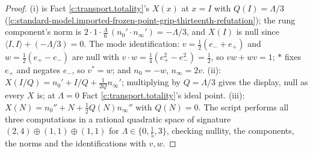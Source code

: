 \documentclass[11pt]{article}
\theoremstyle{definition}
\theoremstyle{plain}
\providecommand{\nInf}{}\renewcommand{\nInf}{n_\infty}
\providecommand{\nO}{}\renewcommand{\nO}{n_0}
\providecommand{\ip}{}\renewcommand{\ip}[2]{\langle #1, #2\rangle}
\begin{document}
\begin{proof}
(i) is Fact \ref{c:transport.totality}'s $X(x)$ at $x = I$ with $Q(I) = \Lambda/3$ (\ref{c:standard-model.imported-frozen-point-grip-thirteenth-refutation}); the rung component's norm is $2 \cdot 1 \cdot \tfrac{\Lambda}{6}\,(\nO' \cdot \nInf') = -\Lambda/3$, and $X(I)$ is null since $\ip{I}{I} + (-\Lambda/3) = 0$. The mode identification: $v = \tfrac12(e_{-} + e_{+})$ and $w = \tfrac12(e_{+} - e_{-})$ are null with $v \cdot w = \tfrac14(e_{+}^{2} - e_{-}^{2}) = \tfrac12$, so $vw + wv = 1$; $*$ fixes $e_{+}$ and negates $e_{-}$, so $v^{*} = w$; and $\nO = -w$, $\nInf = 2v$. (ii): $X(I/Q) = \nO' + I/Q + \tfrac{1}{2Q}\nInf'$; multiplying by $Q = \Lambda/3$ gives the display, null as every $X$ is; at $\Lambda = 0$ Fact \ref{c:transport.totality}'s ideal point. (iii): $X(N) = \nO'' + N + \tfrac12 Q(N)\nInf''$ with $Q(N) = 0$. The script performs all three computations in a rational quadratic space of signature $(2,4) \oplus (1,1) \oplus (1,1)$ for $\Lambda \in \{0, \tfrac15, 3\}$, checking nullity, the components, the norms and the identifications with $v, w$.

\end{proof}
\end{document}
